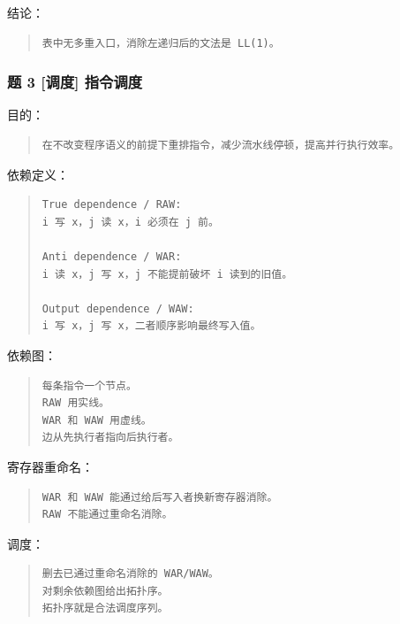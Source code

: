 \documentclass[UTF8,zihao=-4]{ctexart}
\begin{document}
结论：


\begin{quote}
\footnotesize
\begin{verbatim}
表中无多重入口，消除左递归后的文法是 LL(1)。
\end{verbatim}
\end{quote}


\subsubsection{题 3 [调度] 指令调度}


目的：


\begin{quote}
\footnotesize
\begin{verbatim}
在不改变程序语义的前提下重排指令，减少流水线停顿，提高并行执行效率。
\end{verbatim}
\end{quote}


依赖定义：


\begin{quote}
\footnotesize
\begin{verbatim}
True dependence / RAW:
i 写 x，j 读 x，i 必须在 j 前。

Anti dependence / WAR:
i 读 x，j 写 x，j 不能提前破坏 i 读到的旧值。

Output dependence / WAW:
i 写 x，j 写 x，二者顺序影响最终写入值。
\end{verbatim}
\end{quote}


依赖图：


\begin{quote}
\footnotesize
\begin{verbatim}
每条指令一个节点。
RAW 用实线。
WAR 和 WAW 用虚线。
边从先执行者指向后执行者。
\end{verbatim}
\end{quote}


寄存器重命名：


\begin{quote}
\footnotesize
\begin{verbatim}
WAR 和 WAW 能通过给后写入者换新寄存器消除。
RAW 不能通过重命名消除。
\end{verbatim}
\end{quote}


调度：


\begin{quote}
\footnotesize
\begin{verbatim}
删去已通过重命名消除的 WAR/WAW。
对剩余依赖图给出拓扑序。
拓扑序就是合法调度序列。
\end{verbatim}
\end{quote}
\end{document}
